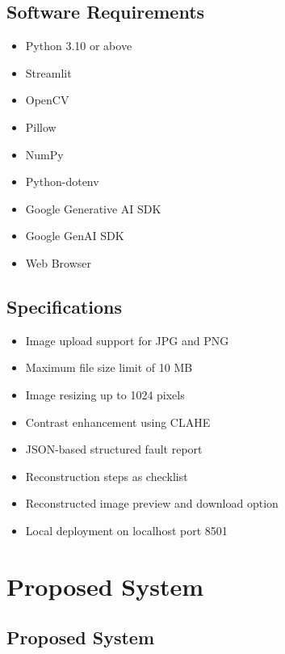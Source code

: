 \documentclass[12pt,a4paper]{report}
\begin{document}
\section{Software Requirements}

\begin{itemize}

\item Python 3.10 or above
\item Streamlit
\item OpenCV
\item Pillow
\item NumPy
\item Python-dotenv
\item Google Generative AI SDK
\item Google GenAI SDK
\item Web Browser

\end{itemize}

\section{Specifications}

\begin{itemize}

\item Image upload support for JPG and PNG
\item Maximum file size limit of 10 MB
\item Image resizing up to 1024 pixels
\item Contrast enhancement using CLAHE
\item JSON-based structured fault report
\item Reconstruction steps as checklist
\item Reconstructed image preview and download option
\item Local deployment on localhost port 8501

\end{itemize}


\chapter{Proposed System}

\section{Proposed System}
\end{document}
